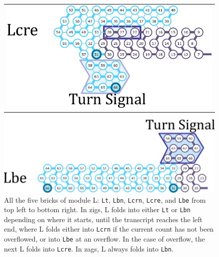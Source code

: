\documentclass[twocolumn]{svjour3}
\begin{document}
\begin{figure}[tb]
\begin{tabular}{c}
  \begin{minipage}{0.5\linewidth}
  \centering
   \includegraphics[width=\linewidth]{fig/svg/Ltre_3.pdf}
 \end{minipage}
 \end{tabular}

  \centering
   \includegraphics[width=0.5\linewidth]{fig/svg/Lbe_3.pdf}


 
 \caption{All the five bricks of module L: \texttt{Lt}, \texttt{Lbn}, \texttt{Lcrn}, \texttt{Lcre}, and \texttt{Lbe} from top left to bottom right.
In zigs, L folds into either \texttt{Lt} or \texttt{Lbn} depending on where it starts, until the transcript reaches the left end, where L folds either into \texttt{Lcrn} if the current count has not been overflowed, or into \texttt{Lbe} at an overflow.
In the case of overflow, the next L folds into \texttt{Lcre}.
In zags, L always folds into \texttt{Lbn}.}
 \label{fig:leftturns}
\end{figure}
\end{document}
